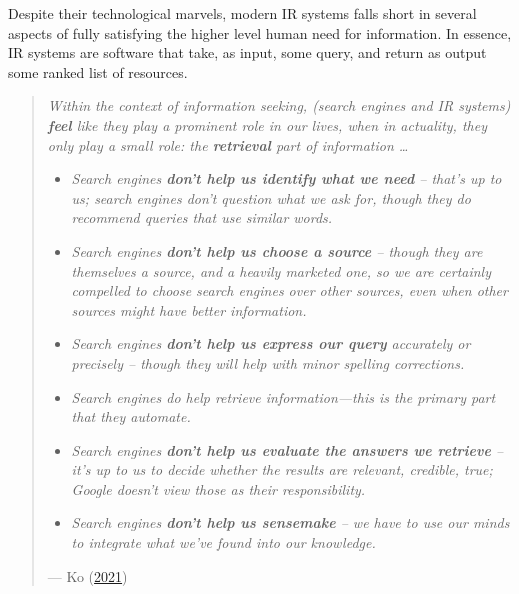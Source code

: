\documentclass[letterpaper, nobind]{templates/ociamthesis}
\begin{document}
Despite their technological marvels, modern IR systems falls short in several aspects of fully satisfying the higher level human need for information.
In essence, IR systems are software that take, as input, some query, and return as output some ranked list of resources.

\begin{quote}
\emph{Within the context of information seeking, (search engines and IR systems) \textbf{feel} like they play a prominent role in our lives, when in actuality, they only play a small role: the \textbf{retrieval} part of information \ldots{}}

\begin{itemize}
\item
  \emph{Search engines \textbf{don't help us identify what we need} -- that's up to us; search engines don't question what we ask for, though they do recommend queries that use similar words.}
\item
  \emph{Search engines \textbf{don't help us choose a source} -- though they are themselves a source, and a heavily marketed one, so we are certainly compelled to choose search engines over other sources, even when other sources might have better information.}
\item
  \emph{Search engines \textbf{don't help us express our query} accurately or precisely -- though they will help with minor spelling corrections.}
\item
  \emph{Search engines do help retrieve information---this is the primary part that they automate.}
\item
  \emph{Search engines \textbf{don't help us evaluate the answers we retrieve} -- it's up to us to decide whether the results are relevant, credible, true; Google doesn't view those as their responsibility.}
\item
  \emph{Search engines \textbf{don't help us sensemake} -- we have to use our minds to integrate what we've found into our knowledge.}
\end{itemize}

\hfill --- Ko (\protect\hyperlink{ref-ko2021seeking}{2021})
\end{quote}
\end{document}
